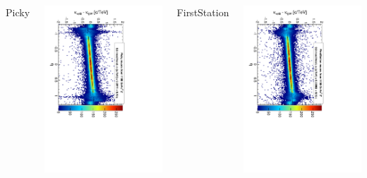 \documentclass[compress]{beamer}
\begin{document}
\begin{frame}
\begin{columns}
\begin{center}
Picky
\end{center}
\includegraphics[height=\linewidth, angle=90]{curvbias_vseta_twist0_5mrad_1100_TeVMuons2picky.pdf}

\begin{center}
FirstStation
\end{center}
\includegraphics[height=\linewidth, angle=90]{curvbias_vseta_twist0_5mrad_1100_TeVMuons2firstHit.pdf}
\end{columns}
\end{frame}
\end{document}

